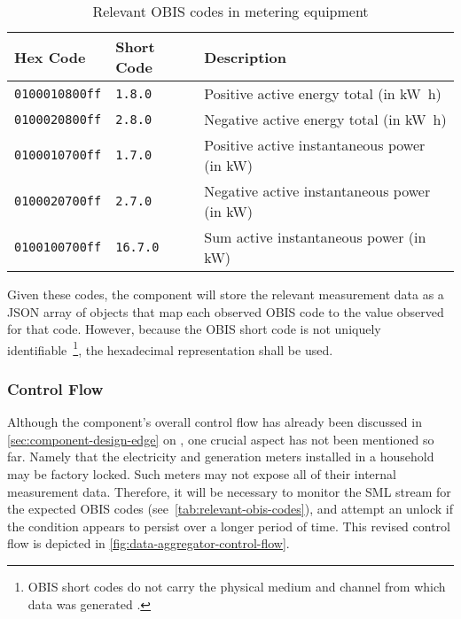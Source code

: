 \begin{table}[hbt]
	\centering
  	\begin{tabularx}{\textwidth}{|l|l|X|}
		\hline
		\textbf{Hex Code} & \textbf{Short Code} & \textbf{Description} \\
	    \hline
	    \texttt{0100010800ff} & \texttt{1.8.0} & Positive active energy total (in \si{\kilo\watt\hour}) \\
	    	\texttt{0100020800ff} & \texttt{2.8.0} & Negative active energy total (in \si{\kilo\watt\hour}) \\
	    \texttt{0100010700ff} & \texttt{1.7.0} & Positive active instantaneous power (in \si{\kilo\watt}) \\
	    \texttt{0100020700ff} & \texttt{2.7.0} & Negative active instantaneous power (in \si{\kilo\watt}) \\
	    	\texttt{0100100700ff} & \texttt{16.7.0} & Sum active instantaneous power (in \si{\kilo\watt}) \\
	    	\hline
	\end{tabularx}
  	\caption{Relevant \acs{OBIS} codes in metering equipment}
  	\label{tab:relevant-obis-codes}
\end{table}

\FloatBarrier

Given these codes, the component will store the relevant measurement data as a \acs{JSON} array of objects that map each observed \acs{OBIS} code to the value observed for that code. However, because the \acs{OBIS} short code is not uniquely identifiable~\footnote{\ac{OBIS} short codes do not carry the physical medium and channel from which data was generated \cite{promoticObis}.}, the hexadecimal representation shall be used.


\subsubsection{Control Flow}
\label{sec:data-aggregator-control-flow}

Although the component's overall control flow has already been discussed in \autoref{sec:component-design-edge} on , one crucial aspect has not been mentioned so far. Namely that the electricity and generation meters installed in a household may be factory locked. Such meters may not expose all of their internal measurement data. Therefore, it will be necessary to monitor the \acs{SML} stream for the expected \acs{OBIS} codes (see~\autoref{tab:relevant-obis-codes}), and attempt an unlock if the condition appears to persist over a longer period of time. This revised control flow is depicted in \autoref{fig:data-aggregator-control-flow}.

